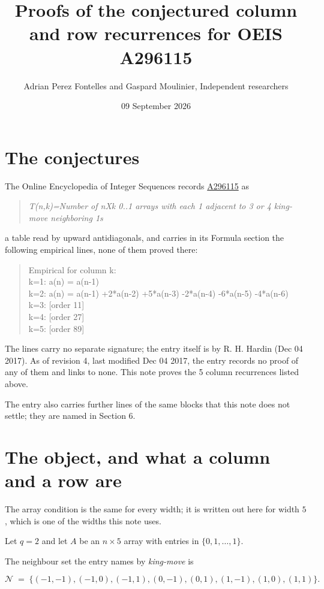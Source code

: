 \documentclass[11pt]{article}
\title{Proofs of the conjectured column and row recurrences for OEIS A296115}
\author{Adrian Perez Fontelles and Gaspard Moulinier, Independent researchers}
\date{09 September 2026}
\theoremstyle{definition}
\begin{document}
\maketitle
\section{The conjectures}

The Online Encyclopedia of Integer Sequences records \href{https://oeis.org/A296115}{A296115} as

\begin{quote}\itshape T(n,k)=Number of nXk 0..1 arrays with each 1 adjacent to 3 or 4 king-move neighboring 1s\end{quote}

a table read by upward antidiagonals, and carries in its Formula section the following empirical lines, none of them proved there:

\begin{quote}\ttfamily Empirical for column k:\\
k=1: a(n) = a(n-1)\\k=2: a(n) = a(n-1) +2*a(n-2) +5*a(n-3) -2*a(n-4) -6*a(n-5) -4*a(n-6)\\k=3: [order 11]\\k=4: [order 27]\\k=5: [order 89]\end{quote}

The lines carry no separate signature; the entry itself is by R. H. Hardin (Dec 04 2017). As of revision 4, last modified Dec 04 2017, the entry records no proof of any of them and links to none. This note proves the 5 column recurrences listed above.

The entry also carries further lines of the same blocks that this note does not settle; they are named in Section 6.

\section{The object, and what a column and a row are}

The array condition is the same for every width; it is written out here for width $5$, which is one of the widths this note uses.

Let $q = 2$ and let $A$ be an $n \times 5$ array with entries in $\{0,1,\dots,1\}$.

The neighbour set the entry names by {\itshape king-move} is

\[\mathcal{N} \;=\; \{(-1,-1), (-1,0), (-1,1), (0,-1), (0,1), (1,-1), (1,0), (1,1)\}.\]
\end{document}
